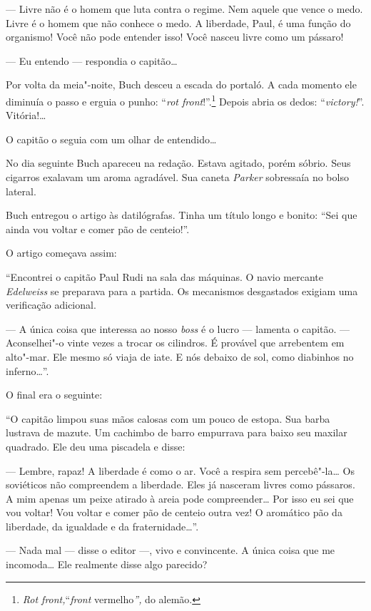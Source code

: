 --- Livre não é o homem que luta contra o regime. Nem aquele que vence o
medo. Livre é o homem que não conhece o medo. A liberdade, Paul, é uma
função do organismo! Você não pode entender isso! Você nasceu livre como
um pássaro!

--- Eu entendo --- respondia o capitão\ldots{}

Por volta da meia"-noite, Buch desceu a escada do portaló. A cada momento
ele diminuía o passo e erguia o punho: ``\emph{rot front}!''.\footnote{\emph{Rot
  front,}``\emph{front} vermelho\emph{'',} do alemão.} Depois abria os
dedos: ``\emph{victory!}''. Vitória!\ldots{}

O capitão o seguia com um olhar de entendido\ldots{}

No dia seguinte Buch apareceu na redação. Estava agitado, porém sóbrio.
Seus cigarros exalavam um aroma agradável. Sua caneta \emph{Parker}
sobressaía no bolso lateral.

Buch entregou o artigo às datilógrafas. Tinha um título longo e bonito:
``Sei que ainda vou voltar e comer pão de centeio!''.

O artigo começava assim:

``Encontrei o capitão Paul Rudi na sala das máquinas. O navio mercante
\emph{Edelweiss} se preparava para a partida. Os mecanismos desgastados
exigiam uma verificação adicional.

--- A única coisa que interessa ao nosso \emph{boss} é o lucro ---
lamenta o capitão. --- Aconselhei"-o vinte vezes a trocar os cilindros. É
provável que arrebentem em alto"-mar. Ele mesmo só viaja de iate. E nós
debaixo de sol, como diabinhos no inferno\ldots{}''.

O final era o seguinte:

``O capitão limpou suas mãos calosas com um pouco de estopa. Sua barba
lustrava de mazute. Um cachimbo de barro empurrava para baixo seu
maxilar quadrado. Ele deu uma piscadela e disse:

--- Lembre, rapaz! A liberdade é como o ar. Você a respira sem
percebê"-la\ldots{} Os soviéticos não compreendem a liberdade. Eles já
nasceram livres como pássaros. A mim apenas um peixe atirado à areia
pode compreender\ldots{} Por isso eu sei que vou voltar! Vou voltar e comer
pão de centeio outra vez! O aromático pão da liberdade, da igualdade e
da fraternidade\ldots{}''.

--- Nada mal --- disse o editor ---, vivo e convincente. A única coisa
que me incomoda\ldots{} Ele realmente disse algo parecido?

